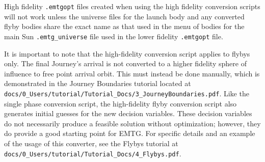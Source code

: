 \begin{alertbox}{}
    \noindent High fidelity {\tt .emtgopt} files created when using the high fidelity conversion scripts will not work unless the universe files for the launch body and any converted flyby bodies share the exact name as that used in the menu of bodies for the main Sun {\tt .emtg\_universe} file used in the lower fidelity {\tt .emtgopt} file.
\end{alertbox}

It is important to note that the high-fidelity conversion script applies to flybys only. The final Journey's arrival is not converted to a higher fidelity sphere of influence to free point arrival orbit. This must instead be done manually, which is demonstrated in the Journey Boundaries tutorial located at {\tt docs/0\_Users/tutorial/Tutorial\_Docs/3\_JourneyBoundaries.pdf}. Like the single phase conversion script, the high-fidelity flyby conversion script also generates initial guesses for the new decision variables. These decision variables do not necessarily produce a feasible solution without optimization; however, they do provide a good starting point for \ac{EMTG}. For specific details and an example of the usage of this converter, see the Flybys tutorial at {\tt docs/0\_Users/tutorial/Tutorial\_Docs/4\_Flybys.pdf}.


